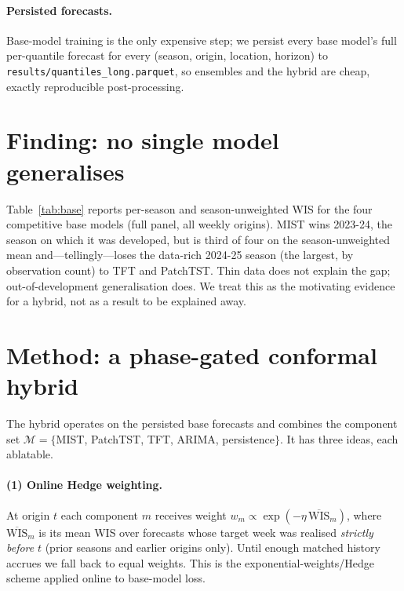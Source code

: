 \documentclass{article}
\begin{document}
\paragraph{Persisted forecasts.} Base-model training is the only expensive step; we persist every
base model's full per-quantile forecast for every (season, origin, location, horizon) to
\texttt{results/quantiles\_long.parquet}, so ensembles and the hybrid are cheap, exactly
reproducible post-processing.

\section{Finding: no single model generalises}

Table~\ref{tab:base} reports per-season and season-unweighted WIS for the four competitive base
models (full panel, all weekly origins). MIST wins 2023-24, the season on which it was developed,
but is third of four on the season-unweighted mean and---tellingly---loses the data-rich 2024-25
season (the largest, by observation count) to TFT and PatchTST. Thin data does not explain the
gap; out-of-development generalisation does. We treat this as the motivating evidence for a hybrid,
not as a result to be explained away.

\begin{table}[t]
\centering
\caption{Multi-season base-model leaderboard (mean WIS; lower is better; paired common forecast mask).
MIST wins only its development season 2023-24 and is third of four on the season-unweighted mean.
Generated from \texttt{results/season\_leaderboard\_common.csv}.}
\label{tab:base}

\end{table}

\section{Method: a phase-gated conformal hybrid}

The hybrid operates on the persisted base forecasts and combines the component set
$\mathcal{M}=\{$MIST, PatchTST, TFT, ARIMA, persistence$\}$. It has three ideas, each ablatable.

\paragraph{(1) Online Hedge weighting.} At origin $t$ each component $m$ receives weight
$w_m \propto \exp(-\eta\,\overline{\text{WIS}}_m)$, where $\overline{\text{WIS}}_m$ is its mean WIS
over forecasts whose target week was realised \emph{strictly before} $t$ (prior seasons and earlier
origins only). Until enough matched history accrues we fall back to equal weights. This is the
exponential-weights/Hedge scheme \cite{cesabianchi2006prediction} applied online to base-model
loss.
\end{document}
